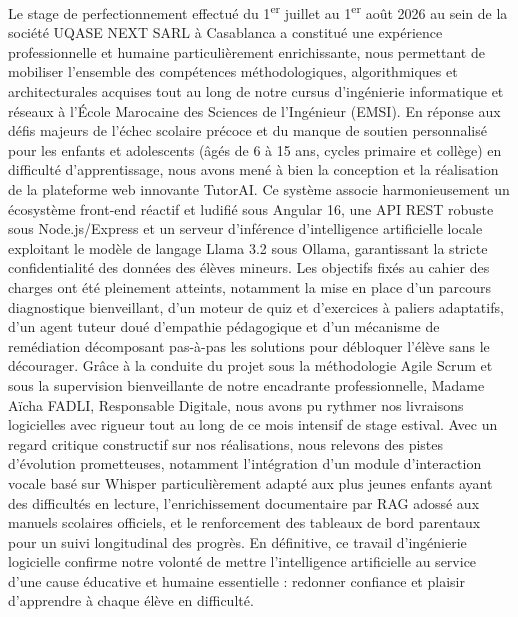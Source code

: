 \documentclass[12pt,a4paper]{report}
\begin{document}
Le stage de perfectionnement effectué du 1\textsuperscript{er} juillet au 1\textsuperscript{er} août 2026 au sein de la société UQASE NEXT SARL à Casablanca a constitué une expérience professionnelle et humaine particulièrement enrichissante, nous permettant de mobiliser l'ensemble des compétences méthodologiques, algorithmiques et architecturales acquises tout au long de notre cursus d'ingénierie informatique et réseaux à l'École Marocaine des Sciences de l'Ingénieur (EMSI). En réponse aux défis majeurs de l'échec scolaire précoce et du manque de soutien personnalisé pour les enfants et adolescents (âgés de 6 à 15 ans, cycles primaire et collège) en difficulté d'apprentissage, nous avons mené à bien la conception et la réalisation de la plateforme web innovante TutorAI. Ce système associe harmonieusement un écosystème front-end réactif et ludifié sous Angular 16, une API REST robuste sous Node.js/Express et un serveur d'inférence d'intelligence artificielle locale exploitant le modèle de langage Llama 3.2 sous Ollama, garantissant la stricte confidentialité des données des élèves mineurs. Les objectifs fixés au cahier des charges ont été pleinement atteints, notamment la mise en place d'un parcours diagnostique bienveillant, d'un moteur de quiz et d'exercices à paliers adaptatifs, d'un agent tuteur doué d'empathie pédagogique et d'un mécanisme de remédiation décomposant pas-à-pas les solutions pour débloquer l'élève sans le décourager. Grâce à la conduite du projet sous la méthodologie Agile Scrum et sous la supervision bienveillante de notre encadrante professionnelle, Madame Aïcha FADLI, Responsable Digitale, nous avons pu rythmer nos livraisons logicielles avec rigueur tout au long de ce mois intensif de stage estival. Avec un regard critique constructif sur nos réalisations, nous relevons des pistes d'évolution prometteuses, notamment l'intégration d'un module d'interaction vocale basé sur Whisper particulièrement adapté aux plus jeunes enfants ayant des difficultés en lecture, l'enrichissement documentaire par RAG adossé aux manuels scolaires officiels, et le renforcement des tableaux de bord parentaux pour un suivi longitudinal des progrès. En définitive, ce travail d'ingénierie logicielle confirme notre volonté de mettre l'intelligence artificielle au service d'une cause éducative et humaine essentielle : redonner confiance et plaisir d'apprendre à chaque élève en difficulté.

\end{document}
